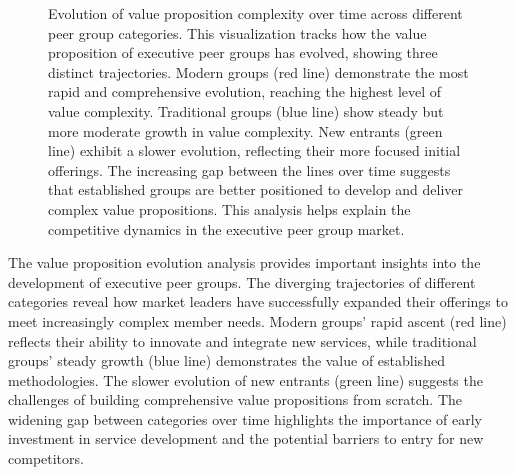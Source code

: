 \documentclass[conference]{IEEEtran}
\begin{document}
\begin{figure}[t]
\centering
{}
\caption{Evolution of value proposition complexity over time across different peer group categories. This visualization tracks how the value proposition of executive peer groups has evolved, showing three distinct trajectories. Modern groups (red line) demonstrate the most rapid and comprehensive evolution, reaching the highest level of value complexity. Traditional groups (blue line) show steady but more moderate growth in value complexity. New entrants (green line) exhibit a slower evolution, reflecting their more focused initial offerings. The increasing gap between the lines over time suggests that established groups are better positioned to develop and deliver complex value propositions. This analysis helps explain the competitive dynamics in the executive peer group market.}
\label{fig:value_evolution}
\end{figure}

The value proposition evolution analysis provides important insights into the development of executive peer groups. The diverging trajectories of different categories reveal how market leaders have successfully expanded their offerings to meet increasingly complex member needs. Modern groups' rapid ascent (red line) reflects their ability to innovate and integrate new services, while traditional groups' steady growth (blue line) demonstrates the value of established methodologies. The slower evolution of new entrants (green line) suggests the challenges of building comprehensive value propositions from scratch. The widening gap between categories over time highlights the importance of early investment in service development and the potential barriers to entry for new competitors.
\end{document}
